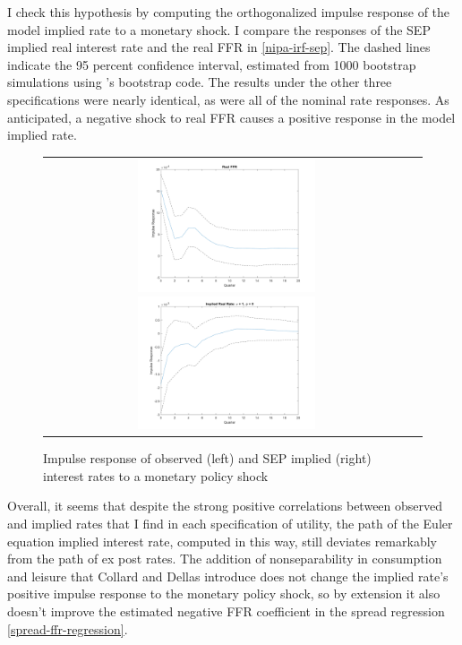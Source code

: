 I check this hypothesis by computing the orthogonalized impulse response of the model implied rate to a monetary shock. I compare the responses of the SEP implied real interest rate and the real FFR in \autoref{nipa-irf-sep}. The dashed lines indicate the 95 percent confidence interval, estimated from 1000 bootstrap simulations using \cite{kilian98}'s bootstrap code.  The results under the other three specifications were nearly identical, as were all of the nominal rate responses. As anticipated, a negative shock to real FFR causes a positive response in the model implied rate.

\begin{figure}[h]
\centering
\captionsetup{singlelinecheck=false, justification=centering}
\caption{Impulse response of observed (left) and SEP implied (right) \\ interest rates to a monetary policy shock}
\label{nipa-irf-sep}
\begin{tabular}{cc}
\includegraphics[width=0.5\textwidth]{figs/nipa/irf/real_ffr}
\includegraphics[width=0.5\textwidth]{figs/nipa/irf/real_implied_sep}
\end{tabular}
\end{figure}

Overall, it seems that despite the strong positive correlations between observed and implied rates that I find in each specification of utility, the path of the Euler equation implied interest rate, computed in this way, still deviates remarkably from the path of ex post rates. The addition of nonseparability in consumption and leisure that Collard and Dellas introduce does not change the implied rate's positive impulse response to the monetary policy shock, so by extension it also doesn't improve the estimated negative FFR coefficient in the spread regression \eqref{spread-ffr-regression}.